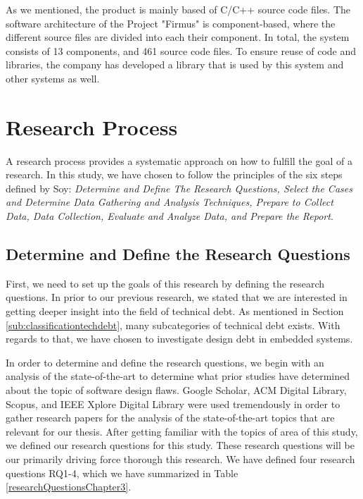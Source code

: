As we mentioned, the product is mainly based of C/C++ source code files. The software architecture of the Project "Firmus" is component-based, where the different source files are divided into each their component. In total, the system consists of 13 components, and 461 source code files. To ensure reuse of code and libraries, the company has developed a library that is used by this system and other systems as well.


\section{Research Process}
\label{sec:researchprocess}
A research process provides a systematic approach on how to fulfill the goal of a research. In this study, we have chosen to follow the principles of the six steps defined by Soy\cite{soysusan}: \textit{Determine and Define The Research Questions, Select the Cases and Determine Data Gathering and Analysis Techniques, Prepare to Collect Data, Data Collection, Evaluate and Analyze Data, and Prepare the Report}.



\subsection{Determine and Define the Research Questions} %
First, we need to set up the goals of this research by defining the research questions. In prior to our previous research\cite{forprosjekt}, we stated that we are interested in getting deeper insight into the field of technical debt. As mentioned in Section \ref{sub:classificationtechdebt}, many subcategories of technical debt exists. With regards to that, we have chosen to investigate design debt in embedded systems.

In order to determine and define the research questions, we begin with an analysis of the state-of-the-art to determine what prior studies have determined about the topic of software design flaws. Google Scholar, ACM Digital Library, Scopus, and IEEE Xplore Digital Library were used tremendously in order to gather research papers for the analysis of the state-of-the-art topics that are relevant for our thesis. After getting familiar with the topics of area of this study, we defined our research questions for this study. These research questions will be our primarily driving force thorough this research. We have defined four research questions RQ1-4, which we have summarized in Table \ref{researchQuestionsChapter3}.

